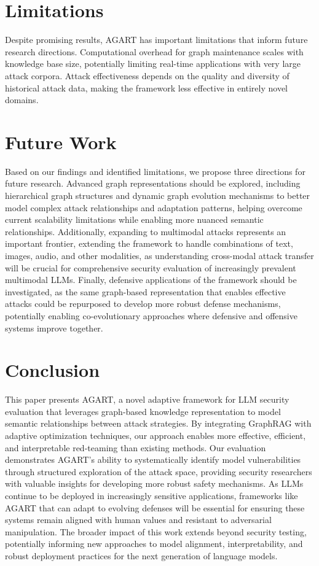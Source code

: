 \section{Limitations}
Despite promising results, AGART has important limitations that inform future research directions. Computational overhead for graph maintenance scales with knowledge base size, potentially limiting real-time applications with very large attack corpora. Attack effectiveness depends on the quality and diversity of historical attack data, making the framework less effective in entirely novel domains.

\section{Future Work}
Based on our findings and identified limitations, we propose three directions for future research. Advanced graph representations should be explored, including hierarchical graph structures and dynamic graph evolution mechanisms to better model complex attack relationships and adaptation patterns, helping overcome current scalability limitations while enabling more nuanced semantic relationships. Additionally, expanding to multimodal attacks represents an important frontier, extending the framework to handle combinations of text, images, audio, and other modalities, as understanding cross-modal attack transfer will be crucial for comprehensive security evaluation of increasingly prevalent multimodal LLMs. Finally, defensive applications of the framework should be investigated, as the same graph-based representation that enables effective attacks could be repurposed to develop more robust defense mechanisms, potentially enabling co-evolutionary approaches where defensive and offensive systems improve together.

\section{Conclusion}
This paper presents AGART, a novel adaptive framework for LLM security evaluation that leverages graph-based knowledge representation to model semantic relationships between attack strategies. By integrating GraphRAG with adaptive optimization techniques, our approach enables more effective, efficient, and interpretable red-teaming than existing methods. Our evaluation demonstrates AGART's ability to systematically identify model vulnerabilities through structured exploration of the attack space, providing security researchers with valuable insights for developing more robust safety mechanisms. As LLMs continue to be deployed in increasingly sensitive applications, frameworks like AGART that can adapt to evolving defenses will be essential for ensuring these systems remain aligned with human values and resistant to adversarial manipulation. The broader impact of this work extends beyond security testing, potentially informing new approaches to model alignment, interpretability, and robust deployment practices for the next generation of language models. 